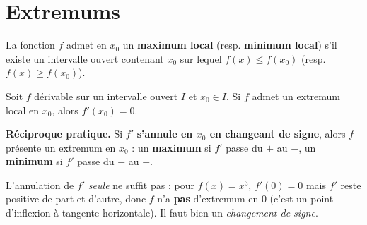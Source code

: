\begin{illus}
\end{illus}

\section{Extremums}

\begin{definition}
La fonction $f$ admet en $x_0$ un \textbf{maximum local} (resp. \textbf{minimum
local}) s'il existe un intervalle ouvert contenant $x_0$ sur lequel $f(x)\le f(x_0)$
(resp. $f(x)\ge f(x_0)$).
\end{definition}

\begin{theoreme}
Soit $f$ dérivable sur un intervalle ouvert $I$ et $x_0\in I$. Si $f$ admet un
extremum local en $x_0$, alors $f'(x_0)=0$.

\medskip
\textbf{Réciproque pratique.} Si $f'$ \textbf{s'annule en $x_0$ en changeant de
signe}, alors $f$ présente un extremum en $x_0$ : un \textbf{maximum} si $f'$ passe
du $+$ au $-$, un \textbf{minimum} si $f'$ passe du $-$ au $+$.
\end{theoreme}

\begin{remarque}
L'annulation de $f'$ \emph{seule} ne suffit pas : pour $f(x)=x^3$, $f'(0)=0$ mais $f'$
reste positive de part et d'autre, donc $f$ n'a \textbf{pas} d'extremum en $0$
(c'est un point d'inflexion à tangente horizontale). Il faut bien un \emph{changement
de signe}.
\end{remarque}

